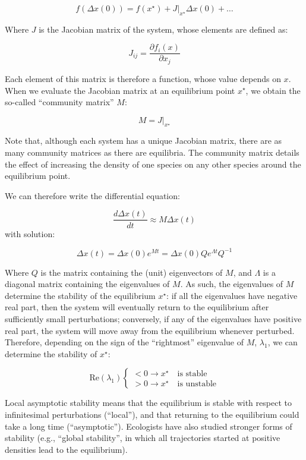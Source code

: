 \documentclass[]{book}
\begin{document}
\[
f(\Delta x(0)) = f(x^\star)+ \left. J \right|_{x^\star} \Delta x(0) + \ldots
\]

Where \(J\) is the Jacobian matrix of the system, whose elements are defined as:

\[
J_{ij} = \frac{\partial f_i({x})}{\partial x_j} 
\]

Each element of this matrix is therefore a function, whose value depends on \({x}\). When we evaluate the Jacobian matrix at an equilibrium point \({x}^\star\), we obtain the so-called ``community matrix'' \({M}\):

\[
  M = \left. {J} \right|_{ {x}^\star}
\]

Note that, although each system has a unique Jacobian matrix, there are as many community matrices as there are equilibria. The community matrix details the effect of increasing the density of one species on any other species around the equilibrium point.

We can therefore write the differential equation:

\[
\frac{d \Delta x(t)}{dt} \approx M \Delta x(t)
\]
with solution:

\[
\Delta x(t) = \Delta x(0) e^{Mt} = \Delta x(0) Q e^{\Lambda t} Q^{-1}
\]

Where \(Q\) is the matrix containing the (unit) eigenvectors of \(M\), and \(\Lambda\) is a diagonal matrix containing the eigenvalues of \(M\). As such, the eigenvalues of \(M\) determine the stability of the equilibrium \({x}^\star\): if all the eigenvalues have negative real part, then the system will eventually return to the equilibrium after sufficiently small perturbations; conversely, if any of the eigenvalues have positive real part, the system will move away from the equilibrium whenever perturbed. Therefore, depending on the sign of the ``rightmost'' eigenvalue of \({M}\), \(\lambda_1\), we can determine the stability of \({x}^\star\):

\[
  \text{Re}(\lambda_1) \begin{cases}
    < 0 \to {x}^\star \quad \text{is stable}\\
    > 0 \to {x}^\star \quad \text{is unstable}
  \end{cases}
\]

Local asymptotic stability means that the equilibrium is stable with respect to infinitesimal perturbations (``local''), and that returning to the equilibrium could take a long time (``asymptotic''). Ecologists have also studied stronger forms of stability (e.g., ``global stability'', in which all trajectories started at positive densities lead to the equilibrium).
\end{document}
